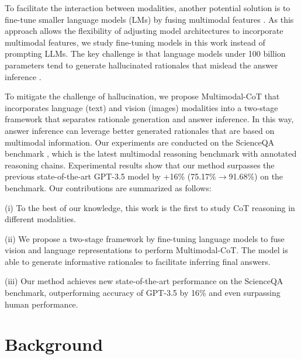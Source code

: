 \documentclass[nohyperref]{article}
\theoremstyle{plain}
\theoremstyle{definition}
\theoremstyle{remark}
\begin{document}
{To facilitate the interaction between modalities, another potential solution is to fine-tune smaller language models (LMs) by fusing multimodal features \citep{zhang2023universal}. As this approach allows the flexibility of adjusting model architectures to incorporate multimodal features, we study fine-tuning models in this work instead of prompting LLMs. The key challenge is that language models under 100 billion parameters tend to generate hallucinated rationales that mislead the answer inference \citep{ho2022large,magister2022teaching,ji2022survey}.}



{To mitigate the challenge of hallucination, we propose Multimodal-CoT that incorporates language (text) and vision (images) modalities into a two-stage framework that separates rationale generation and answer inference. 
In this way, answer inference can leverage better generated rationales that are based on multimodal information.} 
Our experiments are conducted on the ScienceQA benchmark \citep{lu2022learn}, which is the latest multimodal reasoning benchmark with annotated reasoning chains. Experimental results show that our method surpasses the previous state-of-the-art GPT-3.5 model by +16\% (75.17\%$\rightarrow$91.68\%) on the benchmark. Our contributions are summarized as follows:


(i) {To the best of our knowledge, this work is the first to study CoT reasoning in different modalities.}

(ii) We propose a two-stage framework by fine-tuning language models to fuse vision and language representations to perform Multimodal-CoT. The model is able to generate informative rationales to facilitate inferring final answers.

(iii) Our method achieves new state-of-the-art performance on the ScienceQA benchmark, outperforming accuracy of GPT-3.5 by 16\% and even surpassing human performance.





















\section{Background}  
\end{document}

